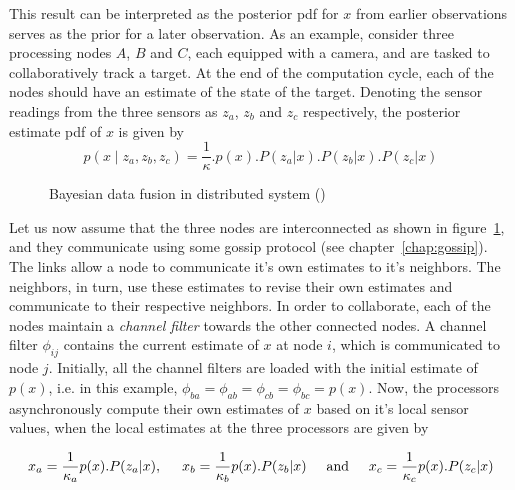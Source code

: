 \noindent
This result can be interpreted as the posterior pdf for $x$ from earlier observations serves as the prior for a later observation.
As an example, consider three processing nodes $A$, $B$ and $C$, each equipped with a camera, and are tasked to collaboratively track
a target. At the end of the computation cycle, each of the nodes should have an estimate of the state of the target. Denoting the sensor 
readings from the three sensors as $z_a$, $z_b$ and $z_c$ respectively, the posterior estimate pdf of $x$ is given by
\begin{equation}
	p( x \mid z_a, z_b, z_c) = \frac{1}{\kappa}. p(x). P(z_a|x). P(z_b|x). P(z_c|x)
\end{equation}

\begin{figure}[!htbp]
	\centerline{
	}
	\caption{Bayesian data fusion in distributed system ()}
	\label{fig:knowledge:bayesian}
\end{figure}
 
\noindent
{}
Let us now assume that the three nodes are interconnected as shown in figure~\ref{fig:knowledge:bayesian}, and they communicate
using some gossip protocol (see chapter~\ref{chap:gossip}). The links allow a node to communicate it's own estimates to it's 
neighbors. The neighbors, in turn, use these estimates to revise their own estimates and communicate to their respective neighbors. 
%
In order to collaborate, each of the nodes maintain a {\em channel filter} towards the other connected nodes.
A channel filter $\phi_{ij}$ contains the current estimate of $x$ at node $i$, which is communicated to node $j$. Initially, all
the channel filters are loaded with the initial estimate of $p(x)$, i.e. in this example, 
$\phi_{ba} = \phi_{ab} = \phi_{cb} = \phi_{bc} = p(x)$.
%
Now, the processors asynchronously compute their own estimates of $x$ based on it's local sensor values, when the local estimates 
at the three processors are given by

\begin{equation}
	x_a = \frac{1}{\kappa_a} p(x).P(z_a|x), \hspace{5mm} 
	x_b = \frac{1}{\kappa_b} p(x).P(z_b|x) \hspace{5mm} \text{and} \hspace{5mm}
	x_c = \frac{1}{\kappa_c} p(x).P(z_c|x)  
\end{equation}

